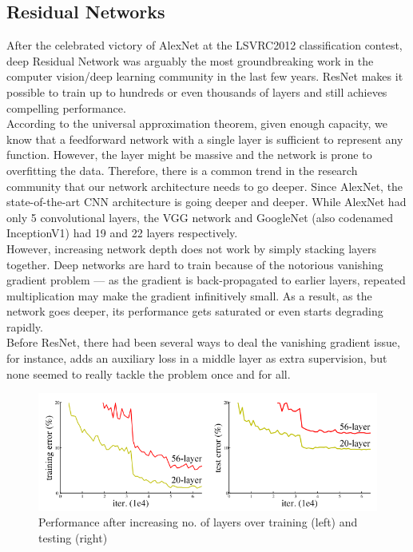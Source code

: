 \documentclass[a4paper,12pt]{report}
\begin{document}
\subsection{Residual Networks}
\hspace*{0.5 in}After the celebrated victory of AlexNet \citep{AlexNet} at the LSVRC2012 classification contest, deep Residual Network \citep{He_2016} was arguably the most groundbreaking work in the computer vision/deep learning community in the last few years. ResNet makes it possible to train up to hundreds or even thousands of layers and still achieves compelling performance.\\
\hspace*{0.5 in}According to the universal approximation theorem, given enough capacity, we know that a feedforward network with a single layer is sufficient to represent any function. However, the layer might be massive and the network is prone to overfitting the data. Therefore, there is a common trend in the research community that our network architecture needs to go deeper. Since AlexNet, the state-of-the-art CNN architecture is going deeper and deeper. While AlexNet had only 5 convolutional layers, the VGG network \citep{VGG2014} and GoogleNet (also codenamed InceptionV1) \citep{Inception2014} had 19 and 22 layers respectively.\\
\hspace*{0.5 in}However, increasing network depth does not work by simply stacking layers together. Deep networks are hard to train because of the notorious vanishing gradient problem — as the gradient is back-propagated to earlier layers, repeated multiplication may make the gradient infinitively small. As a result, as the network goes deeper, its performance gets saturated or even starts degrading rapidly.\\
\hspace*{0.5 in}Before ResNet, there had been several ways to deal the vanishing gradient issue, for instance, \citet{Inception2014} adds an auxiliary loss in a middle layer as extra supervision, but none seemed to really tackle the problem once and for all.\\
\begin{figure}[H]
    \includegraphics[width=\textwidth]{figures/DeepLayers.png}
    \caption{Performance after increasing no. of layers over training (left) and testing (right)}
    \label{depth_CNN}
\end{figure}
\end{document}
